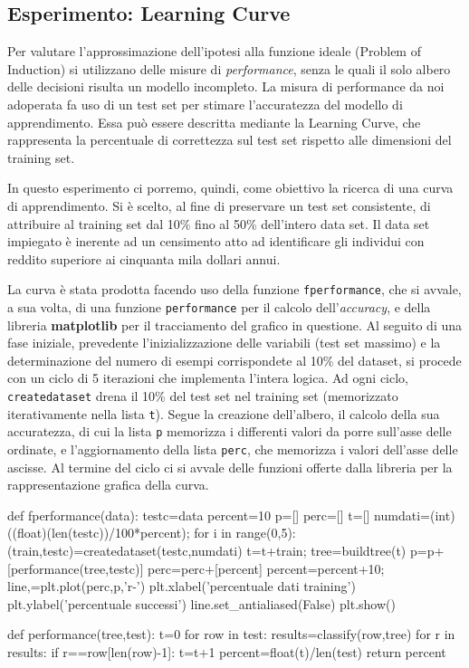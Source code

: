 		\subsection{Esperimento: Learning Curve}
			Per valutare l'approssimazione dell'ipotesi alla funzione ideale (\textsf{Problem of Induction}) si utilizzano delle misure di \emph{performance}, senza le quali il solo albero delle decisioni risulta un modello incompleto. La misura di performance da noi adoperata fa uso di un test set per stimare l'accuratezza del modello di apprendimento. Essa può essere descritta mediante la \textsf{Learning Curve}, che rappresenta la percentuale di correttezza sul test set rispetto alle dimensioni del training set.\par
			In questo esperimento ci porremo, quindi, come obiettivo la ricerca di una curva di apprendimento. Si è scelto, al fine di preservare un test set consistente, di attribuire al training set dal 10\% fino al 50\% dell'intero data set.
			Il data set impiegato è inerente ad un censimento atto ad identificare gli individui con reddito superiore ai cinquanta mila dollari annui.\par
			La curva è stata prodotta facendo uso della funzione \texttt{fperformance}, che si avvale, a sua volta, di una funzione \texttt{performance} per il calcolo dell'\emph{accuracy}, e della libreria \textbf{matplotlib} per il tracciamento del grafico in questione. Al seguito di una fase iniziale, prevedente l'inizializzazione delle variabili (test set massimo) e la determinazione del numero di esempi corrispondete al 10\% del dataset, si procede con un ciclo di 5 iterazioni che implementa l'intera logica. Ad ogni ciclo, \texttt{createdataset} drena il 10\% del test set nel training set (memorizzato iterativamente nella lista \texttt{t}). Segue la creazione dell'albero, il calcolo della sua accuratezza, di cui la lista \texttt{p} memorizza i differenti valori da porre sull'asse delle ordinate, e l'aggiornamento della lista \texttt{perc}, che memorizza i valori dell'asse delle ascisse. Al termine del ciclo ci si avvale delle funzioni offerte dalla libreria per la rappresentazione grafica della curva.
			\bigskip
			\begin{python}
		def fperformance(data):
			testc=data
			percent=10
			p=[]
			perc=[]
			t=[]
			numdati=(int)((float)(len(testc))/100*percent);
			for i in range(0,5):
				(train,testc)=createdataset(testc,numdati)
				t=t+train;
				tree=buildtree(t)
				p=p+[performance(tree,testc)]
				perc=perc+[percent]
				percent=percent+10;
			line,=plt.plot(perc,p,'r-')
			plt.xlabel('percentuale dati training')
			plt.ylabel('percentuale successi')
			line.set_antialiased(False)
			plt.show()
			
			
		def performance(tree,test):
			t=0
			for row in test:
				results=classify(row,tree)
				for r in results:
					if r==row[len(row)-1]:
						t=t+1
			percent=float(t)/len(test)
			return percent
			\end{python}

